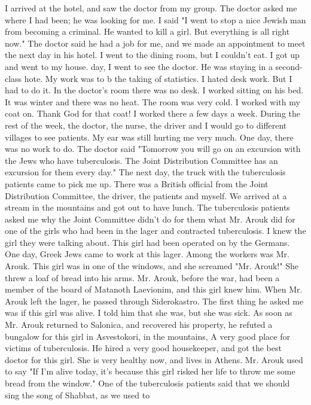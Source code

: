 I arrived at the hotel, and saw the doctor from my group.
The doctor asked me 
where I had been; he was looking for me.
I said "I went to stop a nice Jewish man from 
becoming a criminal.
He wanted to kill a girl.
But everything is all right now."
The 
doctor said he had a job for me, and we made an appointment to meet the next day in his 
hotel.
I went to the dining room, but I couldn't eat.
I got up and went to my house.
day, I went to see the doctor.
He was staying in a second-class hote.
My work was to b the taking of statistics.
I hated desk work.
But I had to do it.
In the doctor's room there was no desk.
I worked sitting on his bed.
It was winter and 
there was no heat.
The room was very cold.
I worked with my coat on.
Thank God for 
that coat!
I worked there a few days a week.
During the rest of the week, the doctor, the 
nurse, the driver and I would go to different villages to see patients.
My ear was still 
hurting me very much.
One day, there was no work to do.
The doctor 
said "Tomorrow you will go on an excursion with the Jews who have tuberculosis.
The 
Joint Distribution Committee has an excursion for them every day."
The next day, the truck with the tuberculosis patients came to pick me up.
There 
was a British official from the Joint Distribution Committee, the driver, the patients 
and myself.
We arrived at a stream in the mountains and got out to have lunch.
The 
tuberculosis patients asked me why the Joint Committee didn't do for them what Mr.
Arouk did for one of the girls who had been in the lager and contracted tuberculosis.
I knew the girl they were talking about.
This girl had been operated on by the 
Germans.
One day, Greek Jews came to work at this lager.
Among the workers was Mr.
Arouk.
This girl was in one of the windows, and she screamed "Mr.
Arouk!"
She threw a 
loaf of bread into his arms.
Mr.
Arouk, before the war, had been a member of the board 
of Matanoth Laevionim, and this girl knew him.
When Mr.
Arouk left the lager, he passed 
through Siderokastro.
The first thing he asked me was if this girl was alive.
I told 
him that she was, but she was sick.
As soon as Mr.
Arouk returned to Salonica, and recovered his property, he refuted a bungalow for this girl in Asvestokori, in the mountains,
A very good place for victims of tuberculosis.
He hired a very good housekeeper, and got the best doctor for this girl.
She is very healthy now, and lives in Athens.
Mr.
Arouk used to 
say "If I'm alive today, it's because this girl risked her life to throw me some bread 
from the window."
One of the tuberculosis patients said that we should sing the song of Shabbat, as we used to 
